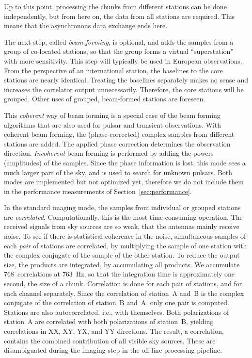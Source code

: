 \documentclass{sig-alternate}
\begin{document}
Up to this point, processing the chunks from different stations can be done
independently, but from here on, the data from all stations are required.
This means that the asynchronous data exchange ends here.

The next step, called \emph{beam forming}, is optional, and adds the samples
from a group of co-located stations, so that the group forms a virtual
``superstation'' with more sensitivity.
This step will typically be used in European observations.
From the perspective of an international station, the baselines to the core
stations are nearly identical.
Treating the baselines separately makes no sense and increases the correlator
output unnecessarily.
Therefore, the core stations will be grouped.
Other uses of grouped, beam-formed stations are foreseen.

This \emph{coherent\/} way of beam forming is a special case of the beam
forming algorithms that are also used for pulsar and transient observations.
With coherent beam forming, the (phase-corrected) complex samples from
different stations are added.
The applied phase correction determines the observation direction.
\emph{Incoherent\/} beam forming is performed by adding the powers (amplitudes)
of the samples.
Since the phase information is lost, this mode sees a much larger part of the
sky, and is used to search for unknown pulsars.
Both modes are implemented but not optimized yet, therefore we do not include
them in the performance measurements of Section~\ref{sec:performance}.

In the standard imaging mode, the samples from individual or grouped stations
are \emph{correlated}.
Computationally, this is the most time-consuming operation.
The received signals from sky sources are so weak, that the antennas mainly
receive noise.
To see if there is statistical coherence in the noise, simultaneous samples of
each \emph{pair\/} of stations are correlated, by multiplying the sample of one
station with the complex conjugate of the sample of the other station.
To reduce the output size, the products are integrated, by accumulating all
products.
We accumulate 768~correlations at 763~Hz, so that the integration time is
approximately one second, the size of a chunk.
Correlation is done for each pair of stations, and for each channel separately.
Since the correlation of station~A and~B is the complex conjugate of the
correlation of station~B and~A, only one pair is computed.
Stations are also autocorrelated, i.e., with themselves.
Both polarizations of station~A are correlated with both polarizations of
station~B, yielding correlations in XX, XY, YX, and YY directions.
The result, a correlation, contains the combined contribution of all visible
sky sources.
These are disambiguated during the imaging step in the off-line processing
pipeline.
\end{document}
